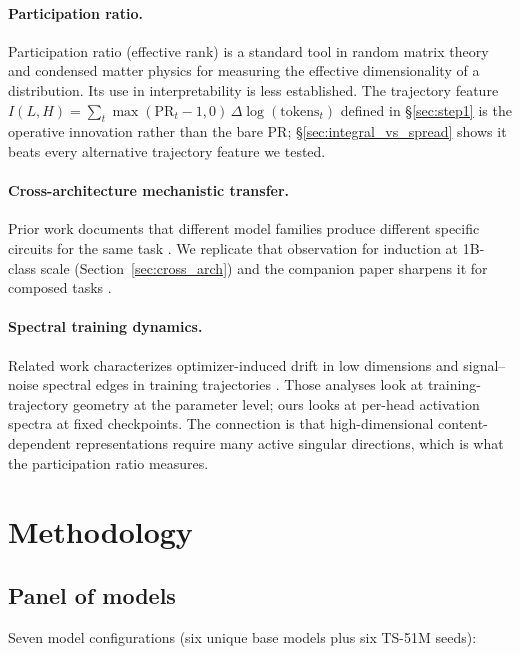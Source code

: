 \documentclass[11pt]{article}
\newcommand{\PR}{\mathrm{PR}}
\begin{document}
\paragraph{Participation ratio.} Participation ratio (effective rank) is a standard tool in random matrix theory and condensed matter physics for measuring the effective dimensionality of a distribution. Its use in interpretability is less established. The trajectory feature $I(L,H) = \sum_t \max(\PR_t - 1, 0)\,\Delta\log(\text{tokens}_t)$ defined in \S\ref{sec:step1} is the operative innovation rather than the bare PR; \S\ref{sec:integral_vs_spread} shows it beats every alternative trajectory feature we tested.

\paragraph{Cross-architecture mechanistic transfer.} Prior work documents that different model families produce different specific circuits for the same task \citep{lieberum2023chinchilla, marks2024sparsefeature}. We replicate that observation for induction at 1B-class scale (Section~\ref{sec:cross_arch}) and the companion paper sharpens it for composed tasks \citep{paper3_circuits}.

\paragraph{Spectral training dynamics.} Related work characterizes optimizer-induced drift in low dimensions \citep{xu2026optimizer} and signal--noise spectral edges in training trajectories \citep{xu2026spectraledge}. Those analyses look at training-trajectory geometry at the parameter level; ours looks at per-head activation spectra at fixed checkpoints. The connection is that high-dimensional content-dependent representations require many active singular directions, which is what the participation ratio measures.

\section{Methodology}
\label{sec:method}

\subsection{Panel of models}
\label{sec:setup}

Seven model configurations (six unique base models plus six TS-51M seeds):
\end{document}

